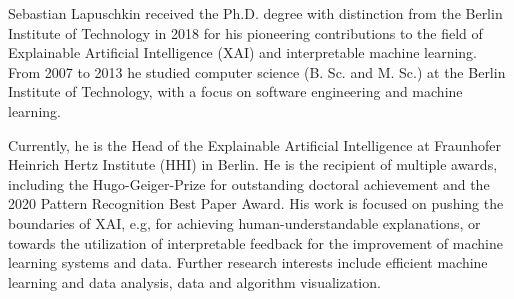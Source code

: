 \documentclass[10pt,a4paper]{article} %
\begin{document}
\spacedhrule{0.9em}{-0.4em} %



\vspace{-1.3em} %

\begin{multicols}{2}  %
\noindent

Sebastian Lapuschkin received the Ph.D. degree with distinction from the Berlin Institute of Technology in 2018
for his pioneering contributions to the field of Explainable Artificial Intelligence (XAI) and interpretable machine learning.
From 2007 to 2013 he studied computer science (B. Sc. and M. Sc.) at the Berlin Institute of Technology,
with a focus on software engineering and machine learning.

Currently, he is the Head of the Explainable Artificial Intelligence at Fraunhofer Heinrich Hertz Institute (HHI) in Berlin.
He is the recipient of multiple awards, including the Hugo-Geiger-Prize for outstanding doctoral achievement and the 2020 Pattern Recognition Best Paper Award.
His work is focused on pushing the boundaries of XAI, e.g, for achieving human-understandable explanations, or towards the utilization of interpretable feedback for the improvement of machine learning systems and data.
Further research interests include efficient machine learning and data analysis, data and algorithm visualization.


\end{multicols}

\spacedhrule{0.5em}{-0.4em} %



\end{document}
